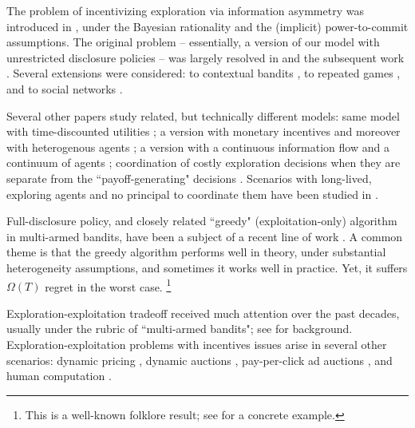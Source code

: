 The problem of incentivizing exploration via information asymmetry was introduced in \cite{Kremer-JPE14}, under the Bayesian rationality and the (implicit) power-to-commit assumptions. The original problem -- essentially, a version of our model with unrestricted disclosure policies -- was largely resolved in \cite{Kremer-JPE14} and the subsequent work \cite{ICexploration-ec15,ICexplorationGames-ec16}. Several extensions were considered: to contextual bandits \cite{ICexploration-ec15}, to repeated games
\cite{ICexplorationGames-ec16}, and to social networks \cite{Bahar-ec16}.

Several other papers study related, but technically different models: same model with time-discounted utilities \cite{Bimpikis-exploration-ms17}; a version with monetary incentives \cite{Frazier-ec14} and moreover with heterogenous agents \cite{Kempe-colt18}; a version with a continuous information flow and a continuum of agents \cite{Che-13}; coordination of costly exploration decisions when they are separate from the ``payoff-generating" decisions \cite{Bobby-Glen-ec16,Annie-ec18-traps,Liang-ec18}. Scenarios with long-lived, exploring agents and no principal to coordinate them have been studied in \cite{Bolton-econometrica99,Keller-econometrica05}.

Full-disclosure policy, and closely related ``greedy" (exploitation-only) algorithm in multi-armed bandits, have been a subject of a recent line of work \cite{Sven-aistats18,kannan2018smoothed,bastani2017exploiting,externalities-colt18,practicalCB-arxiv18}.
A common theme is that the greedy algorithm performs well in theory, under  substantial heterogeneity assumptions, and sometimes it works well in practice. Yet, it suffers $\Omega(T)$ regret in the worst case.%
\footnote{This is a well-known folklore result; \eg see \cite{CompetingBandits-itcs16} for a concrete example.}

Exploration-exploitation tradeoff received much attention over the past decades, usually under the rubric of ``multi-armed bandits"; see  \cite{Bubeck-survey12,Gittins-book11} for background. 
Exploration-exploitation problems with incentives issues arise in several other scenarios: dynamic pricing
    \cite{KleinbergL03,BZ09,BwK-focs13},
dynamic auctions
    \cite{AtheySegal-econometrica13,DynPivot-econometrica10,Kakade-pivot-or13},
pay-per-click ad auctions
    \cite{MechMAB-ec09,DevanurK09,Transform-ec10-jacm},
and human computation
    \cite{RepeatedPA-ec14,Ghosh-itcs13,Krause-www13}.
